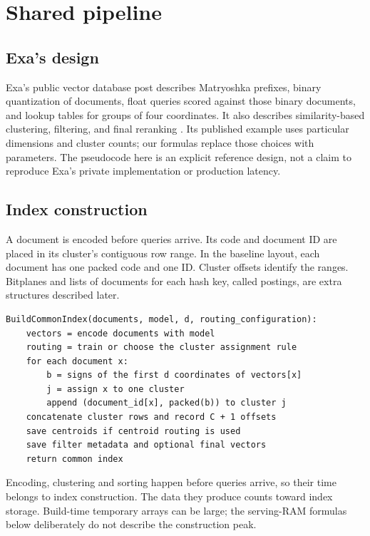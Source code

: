 \section{Shared pipeline}
\label{sec:shared}
\subsection{Exa's design}
Exa's public vector database post describes Matryoshka prefixes, binary quantization of
documents, float queries scored against those binary documents, and lookup tables for groups
of four coordinates. It also describes similarity-based clustering, filtering, and final
reranking \cite{exa}. Its published example uses particular dimensions and cluster counts;
our formulas replace those choices with parameters. The pseudocode here is an explicit
reference design, not a claim to reproduce Exa's private implementation or production latency.

\subsection{Index construction}
A document is encoded before queries arrive. Its code and document ID are placed in its
cluster's contiguous row range. In the baseline layout, each document
has one packed code and one ID. Cluster offsets identify the ranges. Bitplanes and lists of documents for each hash key, called postings, are extra structures
described later.

\par\noindent\begin{minipage}{\linewidth}
\begin{lstlisting}[caption={Common preprocessing; executed before serving queries.}]
BuildCommonIndex(documents, model, d, routing_configuration):
    vectors = encode documents with model
    routing = train or choose the cluster assignment rule
    for each document x:
        b = signs of the first d coordinates of vectors[x]
        j = assign x to one cluster
        append (document_id[x], packed(b)) to cluster j
    concatenate cluster rows and record C + 1 offsets
    save centroids if centroid routing is used
    save filter metadata and optional final vectors
    return common index
\end{lstlisting}
\end{minipage}\par

Encoding, clustering and sorting happen before queries arrive, so their time belongs to
index construction. The data they produce counts toward index storage. Build-time temporary arrays can be
large; the serving-RAM formulas below deliberately do not describe the construction peak.


